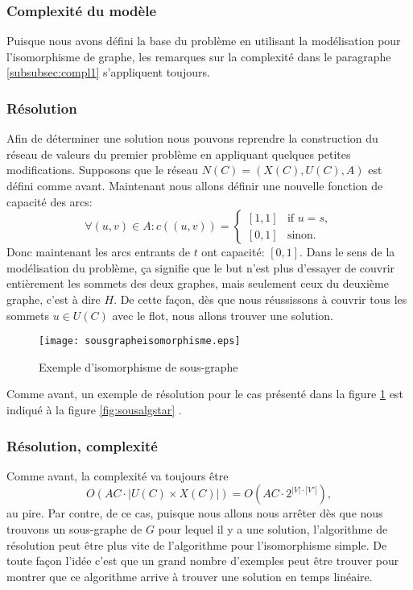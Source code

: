 \documentclass[french]{article}
\theoremstyle{definition}
\theoremstyle{remark}
\begin{document}
\subsubsection{Complexité du modèle}
Puisque nous avons défini la base du problème en utilisant la modélisation pour l'isomorphisme de graphe, les remarques sur la complexité dans le paragraphe \ref{subsubsec:compl1} s'appliquent toujours.

\subsubsection{Résolution}
\label{sssec:res}
Afin de déterminer une solution nous pouvons reprendre la construction du réseau de valeurs du premier problème en appliquant quelques petites modifications. Supposons que le réseau $N(C)=(X(C), U(C), A)$ est défini comme avant. Maintenant nous allons définir une nouvelle fonction de capacité des arcs:
\[  \forall (u,v) \in A:
c((u,v))= 
\begin{cases}
[1,1]& \text{if } u=s,\\
[0,1]              & \text{sinon}.
\end{cases}
\]
Donc maintenant les arcs entrants de $t$ ont capacité: $[0,1]$. Dans le sens de la modélisation du problème, ça signifie que le but n'est plus d'essayer de couvrir entièrement les sommets des deux graphes, mais seulement ceux du deuxième graphe, c'est à dire $H$. De cette façon, dès que nous réussissons à couvrir tous les sommets $u \in U(C)$ avec le flot, nous allons trouver une solution. 
\begin{figure}[t]
	\centering
	\texttt{[image: sousgrapheisomorphisme.eps]}
	\caption{\label{fig:isosubgraph}Exemple d'isomorphisme de sous-graphe}
\end{figure}
Comme avant, un exemple de résolution pour le cas présenté dans la figure \ref{fig:isosubgraph} est indiqué à la figure \ref{fig:sousalgstar} .

\subsubsection{Résolution, complexité}
Comme avant, la complexité va toujours être 
 $$O(AC \cdot |U(C) \times X(C)|)=O(AC \cdot 2^{|V| \cdot |V'|}),$$
au pire. Par contre, de ce cas, puisque nous allons nous arrêter dès que nous trouvons un sous-graphe de $G$ pour lequel il y a une solution, l'algorithme de résolution peut être plus vite de l'algorithme pour l'isomorphisme simple. De toute façon l'idée c'est que un grand nombre d'exemples peut être trouver pour montrer que ce algorithme arrive à trouver une solution en temps linéaire.
\end{document}
